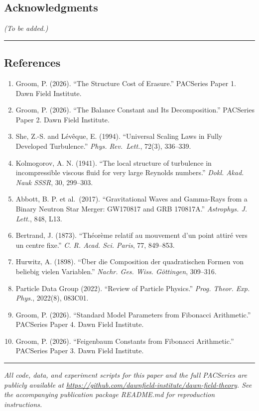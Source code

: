 \documentclass[
  11pt,
  a4paper]{article}
\providecommand{\tightlist}{%
  \setlength{\itemsep}{0pt}\setlength{\parskip}{0pt}}
\begin{document}
\subsection{Acknowledgments}\label{acknowledgments}

\emph{(To be added.)}

\begin{center}\rule{0.5\linewidth}{0.5pt}\end{center}

\subsection{References}\label{references}

\begin{enumerate}
\def\labelenumi{\arabic{enumi}.}
\tightlist
\item
  Groom, P. (2026). ``The Structure Cost of Erasure.'' PACSeries Paper
  1. Dawn Field Institute.
\item
  Groom, P. (2026). ``The Balance Constant and Its Decomposition.''
  PACSeries Paper 2. Dawn Field Institute.
\item
  She, Z.-S. and Lévêque, E. (1994). ``Universal Scaling Laws in Fully
  Developed Turbulence.'' \emph{Phys. Rev.~Lett.}, 72(3), 336--339.
\item
  Kolmogorov, A. N. (1941). ``The local structure of turbulence in
  incompressible viscous fluid for very large Reynolds numbers.''
  \emph{Dokl. Akad. Nauk SSSR}, 30, 299--303.
\item
  Abbott, B. P. et al.~(2017). ``Gravitational Waves and Gamma-Rays from
  a Binary Neutron Star Merger: GW170817 and GRB 170817A.''
  \emph{Astrophys. J. Lett.}, 848, L13.
\item
  Bertrand, J. (1873). ``Théorème relatif au mouvement d'un point attiré
  vers un centre fixe.'' \emph{C. R. Acad. Sci. Paris}, 77, 849--853.
\item
  Hurwitz, A. (1898). ``Über die Composition der quadratischen Formen
  von beliebig vielen Variablen.'' \emph{Nachr. Ges. Wiss. Göttingen},
  309--316.
\item
  Particle Data Group (2022). ``Review of Particle Physics.''
  \emph{Prog. Theor. Exp. Phys.}, 2022(8), 083C01.
\item
  Groom, P. (2026). ``Standard Model Parameters from Fibonacci
  Arithmetic.'' PACSeries Paper 4. Dawn Field Institute.
\item
  Groom, P. (2026). ``Feigenbaum Constants from Fibonacci Arithmetic.''
  PACSeries Paper 3. Dawn Field Institute.
\end{enumerate}

\begin{center}\rule{0.5\linewidth}{0.5pt}\end{center}

\emph{All code, data, and experiment scripts for this paper and the full
PACSeries are publicly available at
\url{https://github.com/dawnfield-institute/dawn-field-theory}. See the
accompanying publication package README.md for reproduction
instructions.}
\end{document}
